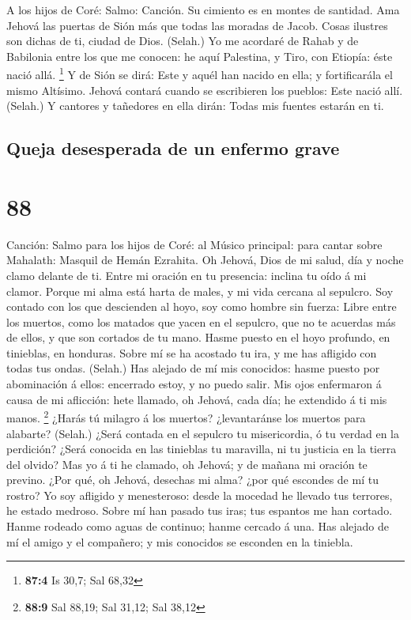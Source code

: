 A los hijos de Coré: Salmo: Canción. Su cimiento es en
montes de santidad.  Ama Jehová las puertas de Sión más que
todas las moradas de Jacob.  Cosas ilustres son dichas de
ti, ciudad de Dios. (Selah.)  Yo me acordaré de Rahab y de
Babilonia entre los que me conocen: he aquí Palestina, y Tiro, con
Etiopía: éste nació allá. \footnote{\textbf{87:4} Is 30,7; Sal 68,32}
 Y de Sión se dirá: Este y aquél han nacido en ella; y
fortificarála el mismo Altísimo.  Jehová contará cuando se
escribieren los pueblos: Este nació allí. (Selah.)  Y
cantores y tañedores en ella dirán: Todas mis fuentes estarán en ti.

\hypertarget{queja-desesperada-de-un-enfermo-grave}{%
\subsection{Queja desesperada de un enfermo
grave}\label{queja-desesperada-de-un-enfermo-grave}}

\hypertarget{section-87}{%
\section{88}\label{section-87}}

 Canción: Salmo para los hijos de Coré: al Músico principal:
para cantar sobre Mahalath: Masquil de Hemán Ezrahita. Oh Jehová, Dios
de mi salud, día y noche clamo delante de ti.  Entre mi
oración en tu presencia: inclina tu oído á mi clamor. 
Porque mi alma está harta de males, y mi vida cercana al sepulcro.
 Soy contado con los que descienden al hoyo, soy como hombre
sin fuerza:  Libre entre los muertos, como los matados que
yacen en el sepulcro, que no te acuerdas más de ellos, y que son
cortados de tu mano.  Hasme puesto en el hoyo profundo, en
tinieblas, en honduras.  Sobre mí se ha acostado tu ira, y
me has afligido con todas tus ondas. (Selah.)  Has alejado
de mí mis conocidos: hasme puesto por abominación á ellos: encerrado
estoy, y no puedo salir.  Mis ojos enfermaron á causa de mi
aflicción: hete llamado, oh Jehová, cada día; he extendido á ti mis
manos. \footnote{\textbf{88:9} Sal 88,19; Sal 31,12; Sal 38,12}
 ¿Harás tú milagro á los muertos? ¿levantaránse los muertos
para alabarte? (Selah.)  ¿Será contada en el sepulcro tu
misericordia, ó tu verdad en la perdición?  ¿Será conocida
en las tinieblas tu maravilla, ni tu justicia en la tierra del olvido?
 Mas yo á ti he clamado, oh Jehová; y de mañana mi oración
te previno.  ¿Por qué, oh Jehová, desechas mi alma? ¿por
qué escondes de mí tu rostro?  Yo soy afligido y
menesteroso: desde la mocedad he llevado tus terrores, he estado
medroso.  Sobre mí han pasado tus iras; tus espantos me han
cortado.  Hanme rodeado como aguas de continuo; hanme
cercado á una.  Has alejado de mí el amigo y el compañero;
y mis conocidos se esconden en la tiniebla.

